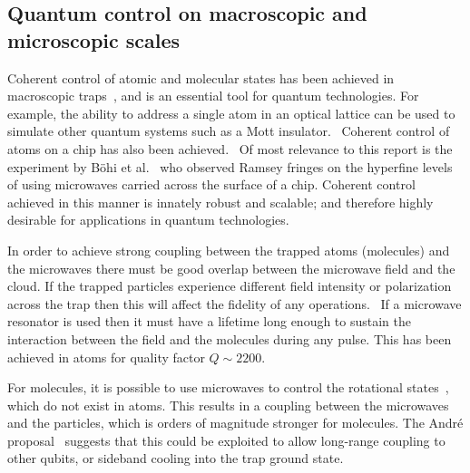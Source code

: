 \subsection{Quantum control on macroscopic and microscopic scales}
\label{litrev:control}


%
Coherent control of atomic and molecular states has been achieved in macroscopic
traps~\cite{Gross995, Blackmore_2018}, and is an essential tool for quantum
technologies. For example, the ability to address a single atom in an optical
lattice can be used to simulate other quantum systems such as a Mott
insulator.~\cite{Weitenberg2011} Coherent control of atoms on a chip has also
been achieved.~\cite{PhysRevLett.92.063601} Of most relevance to this report is
the experiment by B\"ohi et al.~\cite{Boehi2009} who observed Ramsey fringes on
the hyperfine levels of \esRb using microwaves carried across the surface of a
chip. Coherent control achieved in this manner is innately robust and scalable;
and therefore highly desirable for applications in quantum technologies.

%
In order to achieve strong coupling between the trapped atoms (molecules) and the
microwaves there must be good overlap between the microwave field and the cloud.
If the trapped particles experience different field intensity or polarization
across the trap then this will affect the fidelity of any
operations.~\cite{Williams2018} If a microwave resonator is used then it must
have a lifetime long enough to sustain the interaction between the field and the
molecules during any pulse. This has been achieved in atoms for quality factor
$Q\sim2200$.~\cite{Hattermann2017}

For molecules, it is possible to use microwaves to control the rotational
states~\cite{Blackmore_2018}, which do not exist in atoms. This results in a
coupling between the microwaves and the particles, which is orders of magnitude
stronger for molecules. The Andr\'e proposal~\cite{Andre2006} suggests that this
could be exploited to allow long-range coupling to other qubits, or sideband
cooling into the trap ground state.

